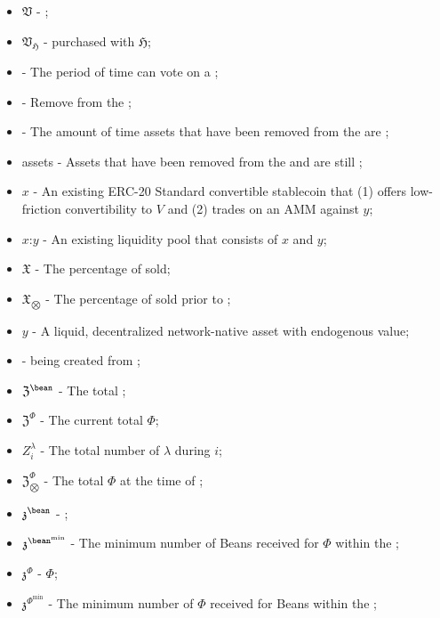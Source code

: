 \documentclass[class=article, crop=false]{standalone}
\begin{document}
\begin{itemize}[topsep=0pt, itemsep=3pt,leftmargin=16pt]
    \item[] $\mathfrak{V}$ -  ;
    \item[] $\mathfrak{V}_\mathfrak{H}$ -   purchased with  $\mathfrak{H}$;
    \item[]  - The period of time  can vote on a ;
    \item[]  - Remove from the ;
    \item[]   - The amount of time assets that have been removed from the  are ;
    \item[]  assets - Assets that have been removed from the  and are still ;
    \item[] $x$ - An existing ERC-20 Standard convertible stablecoin that (1) offers low-friction convertibility to $V$ and (2) trades on an AMM against $y$;
    \item[] $x$:$y$ - An existing liquidity pool that consists of $x$ and $y$;
    \item[] $\mathfrak{X}$ - The percentage of  sold;
    \item[] $\mathfrak{X}_{\bigotimes}$ - The percentage of  sold prior to ;
    \item[] $y$ - A liquid, decentralized network-native asset with endogenous value;
    \item[]  -  being created from  \Bean;
    \item[] $\mathfrak{Z}^{\bean}$ - The total  \Bean;
    \item[] $\mathfrak{Z}^{\Phi}$ - The current total  $\Phi$;
    \item[] $Z_i^{\lambda}$ - The total number of $\lambda$  during  $i$;
    \item[] $\mathfrak{Z}_{\bigotimes}^{\Phi}$ - The total  $\Phi$ at the time of ;
    \item[] $\mathfrak{z}^{\bean}$ -  \Bean;
    \item[] $\mathfrak{z}^{\bean^{\text{min}}}$ - The minimum number of  Beans received for    $\Phi$ within the ;
    \item[] $\mathfrak{z}^{\Phi}$ -  $\Phi$;
    \item[] $\mathfrak{z}^{\Phi^{\text{min}}}$ - The minimum number of  $\Phi$ received for    Beans within the ;

\end{itemize}
\end{document}
